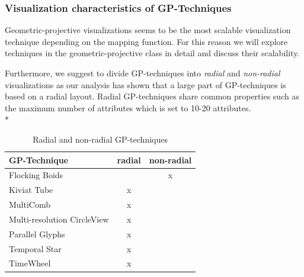 \subsubsection{Visualization characteristics of GP-Techniques} \label{GP-Techniques}
Geometric-projective visualizations seems to be the most scalable visualization technique depending on the mapping function. For this reason we will explore techniques in the geometric-projective class in detail and discuss their scalability.


Furthermore, we suggest to divide GP-techniques into \textit{radial} and \textit{non-radial} visualizations\cite{Diehl2010} as our  analysis has shown that a large part of GP-techniques is based on a radial layout. Radial GP-techniques share common properties such as the maximum number of attributes which is set to 10-20 attributes\cite{Diehl2010}.\\*


\begin{table}[H]
	\centering
	\caption[Table 1]{Radial and non-radial GP-techniques}
	\label{radialTable}
	\begin{tabu}{lcc}
	\toprule
	GP-Technique & radial & non-radial \\
	\midrule
	Flocking Boids &  & x \\
	Kiviat Tube & x &  \\
	MultiComb & x &  \\
	Multi-resolution CircleView & x &  \\
	Parallel Glyphs & x &  \\
    Temporal Star & x &  \\
	TimeWheel & x & \\
	\bottomrule
	\end{tabu}
\end{table}

